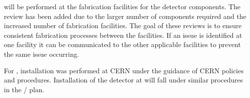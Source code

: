  will be performed at the fabrication facilities for the
 detector components. The review has been added due to the
larger number of components required and the increased number of
fabrication facilities. The goal of these reviews is to ensure
consistent fabrication processes between the facilities. If an issue
is identified at one facility it can be communicated to the other
applicable facilities to prevent the same issue occurring.

For , installation was performed at CERN under the
guidance of CERN policies and procedures. Installation of the
 detector at \surf will fall under similar procedures in the
/  plan.
